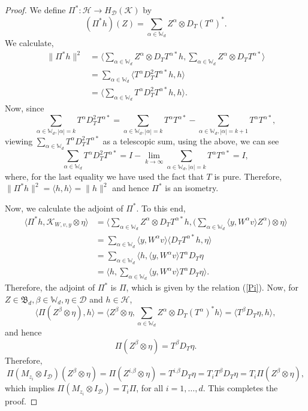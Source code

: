 \documentclass[10pt,a4paper]{amsart}
\newcommand{\bW}{\mathbb{W}}
\newcommand{\cld}{\mathcal{D}}
\newcommand{\clh}{\mathcal{H}}
\newcommand{\clk}{\mathcal{K}}
\newcommand{\fB}{{\mathfrak{B}}}
\newcommand\la{{\langle }}
\newcommand\ra{{\rangle}}
\begin{document}
\begin{proof}
We define $\Pi^*:\clh\to H_{\cld}(\clk)$ by
\[
(\Pi^*h)(Z)=\sum_{\alpha\in\bW_d}Z^{\alpha}\otimes D_T(T^{\alpha})^*.
\]
We calculate,
\begin{align*}
\|\Pi^*h\|^2
&=\Big\langle \sum_{\alpha\in \bW_d} Z^{\alpha}\otimes D_TT^{\alpha*}h, \sum_{\alpha\in \bW_d} Z^{\alpha}\otimes D_TT^{\alpha*}\Big\rangle\\
&= \sum_{\alpha\in \bW_d}\la T^{\alpha}D_T^2T^{\alpha*}h,h\ra\\
&= \Big\langle \sum_{\alpha\in \bW_d} T^{\alpha}D_T^2T^{\alpha*}h,h \Big\rangle.
\end{align*}
Now, since
\[
\sum_{\alpha\in \bW_d, |\alpha|=k} T^{\alpha}D_T^2T^{\alpha*}=\sum_{\alpha\in \bW_d, |\alpha|=k} T^{\alpha}T^{\alpha*}-\sum_{\alpha\in \bW_d, |\alpha|=k+1} T^{\alpha}T^{\alpha*},
\]
viewing $\sum_{\alpha\in \bW_d} T^{\alpha}D_T^2T^{\alpha*}$ as a telescopic sum, using the above, we can see
\begin{equation}\label{identity}
\sum_{\alpha\in \bW_d} T^{\alpha}D_T^2T^{\alpha*}= I-\lim_{k\to \infty}\sum_{\alpha\in \bW_d, |\alpha|=k} T^{\alpha}T^{\alpha*}=I,
\end{equation}
where, for the last equality we have used the fact that $T$ is pure. Therefore,
$\|\Pi^*h\|^2=\la h,h\ra=\|h\|^2$ and hence $\Pi^*$ is an isometry.

Now, we calculate the adjoint of $\Pi^*$. To this end,
\begin{align*}
\la \Pi^*h, \clk_{W,v,y}\otimes\eta\ra&=\Big\langle \sum_{\alpha\in \bW_d} Z^{\alpha}\otimes D_TT^{\alpha*}h, \Big (\sum_{\alpha\in \bW_d} \la y, W^\alpha v\ra Z^\alpha \Big )\otimes \eta \Big\rangle \\
&=\sum_{\alpha\in \bW_d}\la y, W^\alpha v \ra \la D_TT^{\alpha*}h, \eta\ra\\
&=\sum_{\alpha\in \bW_d} \big\langle h, \la y, W^\alpha v \ra T^{\alpha} D_T\eta\\
&= \Big\langle h, \sum_{\alpha\in \bW_d} \la y, W^\alpha v \ra T^{\alpha} D_T\eta
\Big\rangle. 
\end{align*}
Therefore, the adjoint of $\Pi^*$ is $\Pi$, which is given by the relation (\ref{Pi}). Now, for $Z\in\fB_d,\beta\in\bW_d,\eta\in\cld$ and $h\in\clh$,
\[
\la \Pi (Z^{\beta}\otimes \eta), h \ra=\Big\langle Z^{\beta}\otimes \eta, \sum_{\alpha\in\bW_d}Z^{\alpha}\otimes D_T(T^{\alpha})^*h  \Big\rangle= \la T^{\beta} D_T\eta, h\ra,
\]
and hence
\[
\Pi (Z^{\beta}\otimes \eta)=T^{\beta} D_T\eta.
\]
Therefore,
\begin{equation}\label{dilation_intertwiner}
\Pi (M_{z_i}\otimes I_{\cld})(Z^{\beta}\otimes \eta)=\Pi (Z^{i.\beta}\otimes \eta)= T^{i.\beta} D_T\eta=T_i T^{\beta} D_T\eta=T_i\Pi(Z^{\beta}\otimes \eta),
\end{equation}
which implies $\Pi (M_{z_i}\otimes I_{\cld})= T_i\Pi$, for all $i=1,\ldots,d$. This completes the proof.
\end{proof}
\end{document}
